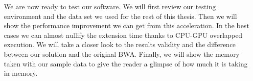 We are now ready to test our software. We will first review our testing environment and the data set we used for the rest of this thesis. Then we will show the performance improvement we can get from this acceleration. In the best cases we can almost nullify the extension time thanks to CPU-GPU overlapped execution. We will take a closer look to the results validity and the difference between our solution and the original BWA. Finally, we will show the memory taken with our sample data to give the reader a glimpse of how much it is taking in memory.